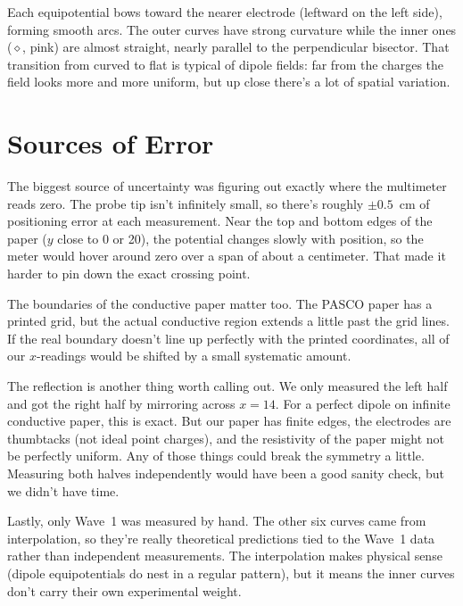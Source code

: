\documentclass[12pt]{article}
\begin{document}
Each equipotential bows toward the nearer electrode (leftward on the left side), forming smooth arcs. The outer curves have strong curvature while the inner ones ($\diamond$, pink) are almost straight, nearly parallel to the perpendicular bisector. That transition from curved to flat is typical of dipole fields: far from the charges the field looks more and more uniform, but up close there's a lot of spatial variation.

\section{Sources of Error}

The biggest source of uncertainty was figuring out exactly where the multimeter reads zero. The probe tip isn't infinitely small, so there's roughly $\pm 0.5$~cm of positioning error at each measurement. Near the top and bottom edges of the paper ($y$ close to 0 or 20), the potential changes slowly with position, so the meter would hover around zero over a span of about a centimeter. That made it harder to pin down the exact crossing point.

The boundaries of the conductive paper matter too. The PASCO paper has a printed grid, but the actual conductive region extends a little past the grid lines. If the real boundary doesn't line up perfectly with the printed coordinates, all of our $x$-readings would be shifted by a small systematic amount.

The reflection is another thing worth calling out. We only measured the left half and got the right half by mirroring across $x = 14$. For a perfect dipole on infinite conductive paper, this is exact. But our paper has finite edges, the electrodes are thumbtacks (not ideal point charges), and the resistivity of the paper might not be perfectly uniform. Any of those things could break the symmetry a little. Measuring both halves independently would have been a good sanity check, but we didn't have time.

Lastly, only Wave~1 was measured by hand. The other six curves came from interpolation, so they're really theoretical predictions tied to the Wave~1 data rather than independent measurements. The interpolation makes physical sense (dipole equipotentials do nest in a regular pattern), but it means the inner curves don't carry their own experimental weight.

\end{document}
